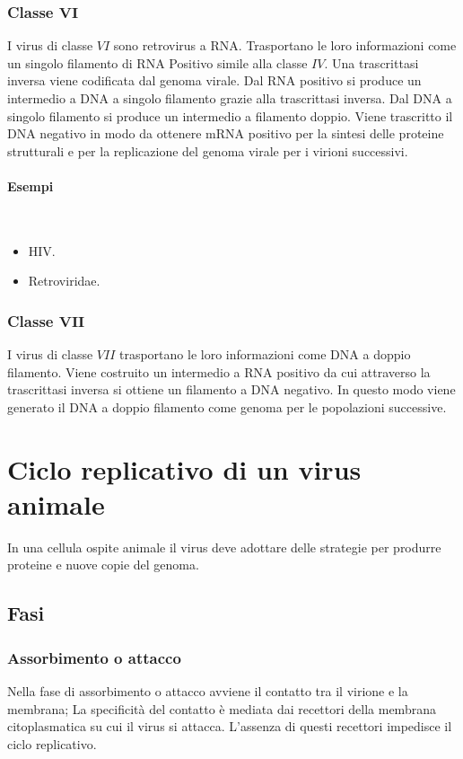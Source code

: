 		\subsubsection{Classe $\mathbf{VI}$}
		I virus di classe $VI$ sono retrovirus a RNA.
		Trasportano le loro informazioni come un singolo filamento di RNA Positivo simile alla classe $IV$.
		Una trascrittasi inversa viene codificata dal genoma virale.
		Dal RNA positivo si produce un intermedio a DNA a singolo filamento grazie alla trascrittasi inversa.
		Dal DNA a singolo filamento si produce un intermedio a filamento doppio.
		Viene trascritto il DNA negativo in modo da ottenere mRNA positivo per la sintesi delle proteine strutturali e per la replicazione del genoma virale per i virioni successivi.
			
			\paragraph{Esempi}\mbox{}\\
			\begin{multicols}{2}
				\begin{itemize}
					\item HIV.
					\item Retroviridae.
				\end{itemize}
			\end{multicols}

		\subsubsection{Classe $\mathbf{VII}$}
		I virus di classe $VII$ trasportano le loro informazioni come DNA a doppio filamento.
		Viene costruito un intermedio a RNA positivo da cui attraverso la trascrittasi inversa si ottiene un filamento a DNA negativo.
		In questo modo viene generato il DNA a doppio filamento come genoma per le popolazioni successive.

\section{Ciclo replicativo di un virus animale}
In una cellula ospite animale il virus deve adottare delle strategie per produrre proteine e nuove copie del genoma.

	\subsection{Fasi}

		\subsubsection{Assorbimento o attacco}
		Nella fase di assorbimento o attacco avviene il contatto tra il virione e la membrana;
		La specificit\`a del contatto \`e mediata dai recettori della membrana citoplasmatica su cui il virus si attacca.
		L'assenza di questi recettori impedisce il ciclo replicativo.

